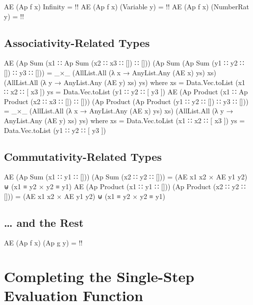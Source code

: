 \documentclass{report}
\begin{document}
\begin{code}
  AE (Ap f x) Infinity = {!!}
  AE (Ap f x) (Variable y) = {!!}
  AE (Ap f x) (NumberRat y) = {!!}
\end{code}

\subsection{Associativity-Related Types}

\begin{code}
  AE (Ap Sum (x1 ∷ Ap Sum (x2 ∷ x3 ∷ []) ∷ []))
     (Ap Sum (Ap Sum (y1 ∷ y2 ∷ []) ∷ y3 ∷ [])) =
     _×_ (AllList.All (λ x → AnyList.Any (AE x) ys) xs)
         (AllList.All (λ y → AnyList.Any (AE y) xs) ys)
     where
     xs = Data.Vec.toList (x1 ∷ x2 ∷ [ x3 ])
     ys = Data.Vec.toList (y1 ∷ y2 ∷ [ y3 ])
  AE (Ap Product (x1 ∷ Ap Product (x2 ∷ x3 ∷ []) ∷ []))
     (Ap Product (Ap Product (y1 ∷ y2 ∷ []) ∷ y3 ∷ [])) =
     _×_ (AllList.All (λ x → AnyList.Any (AE x) ys) xs)
         (AllList.All (λ y → AnyList.Any (AE y) xs) ys)
     where
     xs = Data.Vec.toList (x1 ∷ x2 ∷ [ x3 ])
     ys = Data.Vec.toList (y1 ∷ y2 ∷ [ y3 ])
\end{code}

\subsection{Commutativity-Related Types}

\begin{code}
  AE (Ap Sum (x1 ∷ y1 ∷ [])) (Ap Sum (x2 ∷ y2 ∷ [])) =
    (AE x1 x2 × AE y1 y2) ⊎ (x1 ≡ y2 × y2 ≡ y1)
  AE (Ap Product (x1 ∷ y1 ∷ [])) (Ap Product (x2 ∷ y2 ∷ [])) =
    (AE x1 x2 × AE y1 y2) ⊎ (x1 ≡ y2 × y2 ≡ y1)
\end{code}

\subsection{\ldots{} and the Rest}

\begin{code}
  AE (Ap f x) (Ap g y) = {!!}
\end{code}

\section{Completing the Single-Step Evaluation Function}
\end{document}
